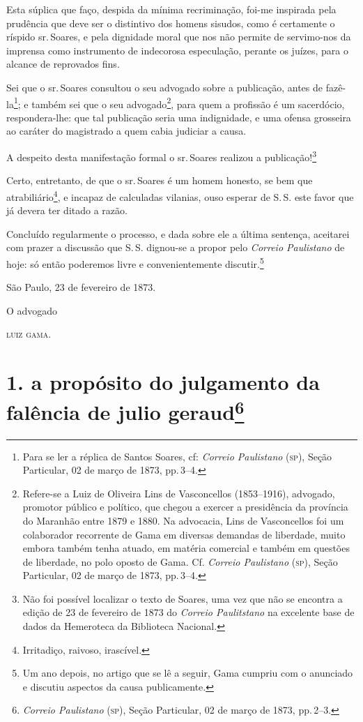 Esta súplica que faço, despida da mínima recriminação, foi-me inspirada
pela prudência que deve ser o distintivo dos homens sisudos, como é
certamente o ríspido sr.\,Soares, e pela dignidade moral que nos não
permite de servimo-nos da imprensa como instrumento de indecorosa
especulação, perante os juízes, para o alcance de reprovados fins.

Sei que o sr.\,Soares consultou o seu advogado sobre a publicação, antes
de fazê-la\footnote{ Para se ler a réplica de Santos Soares, cf:
  \emph{Correio Paulistano} (\textsc{sp}), Seção Particular, 02 de março de 1873, pp.\,3--4.};
e também sei que o seu advogado\footnote{ Refere-se a Luiz de Oliveira
  Lins de Vasconcellos (1853--1916), advogado, promotor público e
  político, que chegou a exercer a presidência da província do Maranhão
  entre 1879 e 1880. Na advocacia, Lins de Vasconcellos foi um
  colaborador recorrente de Gama em diversas demandas de liberdade,
  muito embora também tenha atuado, em matéria comercial e também em
  questões de liberdade, no polo oposto de Gama. Cf. \emph{Correio
  Paulistano} (\textsc{sp}), Seção Particular, 02 de março de 1873, pp.\,3--4.}, para quem a
profissão é um sacerdócio, respondera-lhe: que tal publicação seria uma
indignidade, e uma ofensa grosseira ao caráter do magistrado a quem
cabia judiciar a causa.

A despeito desta manifestação formal o sr.\,Soares realizou a
publicação!\footnote{ Não foi possível localizar o texto de Soares, uma
  vez que não se encontra a edição de 23 de fevereiro de 1873 do \emph{Correio
  Paulitstano} na excelente base de dados da Hemeroteca da Biblioteca
  Nacional.}

Certo, entretanto, de que o sr.\,Soares é um homem honesto, se bem que
atrabiliário\footnote{ Irritadiço, raivoso, irascível.}, e incapaz de
calculadas vilanias, ouso esperar de S.\,S. este favor que já devera ter
ditado a razão.

Concluído regularmente o processo, e dada sobre ele a última sentença,
aceitarei com prazer a discussão que S.\,S. dignou-se a propor pelo
\emph{Correio Paulistano} de hoje: só então poderemos livre e
convenientemente discutir.\footnote{ Um ano depois, no artigo que se lê
  a seguir, Gama cumpriu com o anunciado e discutiu aspectos da causa
  publicamente.}

São Paulo, 23 de fevereiro de 1873.

O advogado

\textsc{luiz gama}.

\chapter{1. a propósito do julgamento da falência de julio geraud\footnote{\emph{Correio Paulistano} (\textsc{sp}), Seção Particular,
  02 de março de 1873, pp.\,2--3.}} %

